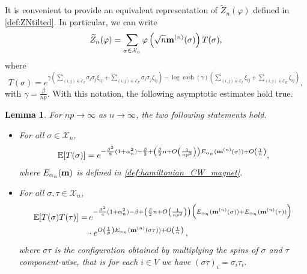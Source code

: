 \documentclass[11pt,oneside]{amsart}
\numberwithin{equation}{section}  %
\theoremstyle{plain}
\newtheorem{lemma}[theorem]{Lemma}
\theoremstyle{remark}
\def \E {{\mathbb E}}
\def \cE {\mathcal{E}}
\def \s {{\sigma}}
\def \bm {{\bf m}}
\begin{document}
It is convenient to provide an equivalent representation of $\widetilde{Z}_n(\varphi)$ defined in \eqref{def:ZNtilted}.
In particular, we can write
\begin{equation}
\label{eq:ZT}
\widetilde{Z}_n(\varphi) = \sum_{\sigma \in \mathcal{X}_n} \varphi\left(\sqrt{n} \bm^{(n)}(\sigma) \right) T(\sigma),
\end{equation}
where
\begin{equation}
\label{def:Tsigma}
T(\sigma) = e^{\gamma \left( \sum_{(i,j) \in \cE_I} \sigma_i \sigma_j \xi_{ij} + \sum_{(i,j) \in \cE_E} \sigma_i \sigma_j \zeta_{ij} \right) - \log \cosh(\gamma) \left(\sum_{(i,j) \in \cE_I} \xi_{ij} + \sum_{(i,j) \in \cE_E} \zeta_{ij}\right)},
\end{equation}
with $\gamma = \frac{\beta}{np}$. With this notation, the following asymptotic estimates hold true.
\begin{lemma}
\label{lemma:T}
For $np \to \infty$ as $n \to \infty$, the two following statements hold.
\begin{itemize}
\item[(i)] For all $\sigma \in \mathcal{X}_n$,
$$ 
\E[T(\sigma)] = 
e^{- \frac{\beta^2}{8} (1+\alpha_n^2)-\frac{\beta}{2} + \left(\frac{\beta}{2}n+O\left(\frac{1}{np^2}\right)\right) E_{\alpha_n}(\bm^{(n)}(\s)) +O \left ( \frac{1}{n}\right )},
$$
where $E_{\alpha_n}(\bm)$ is defined in \eqref{def:hamiltonian_CW_magnet}.
\item[(ii)] For all $\sigma, \tau \in \mathcal{X}_n$,
\[
\begin{split}
\E[T(\sigma)T(\tau)] 
= &\, e^{- \frac{\beta^2}{4} (1+\alpha_n^2) -\beta
 + \left(\frac{\beta}{2}n+O\left(\frac{1}{np^2}\right)\right)
\Big( E_{\alpha_n} (\bm^{(n)}(\sigma)) +E_{\alpha_n}(\bm^{(n)}(\tau)) \Big)}\\
& \cdot e^{ O\left(\frac{1}{p}\right) E_{\alpha_n} (\bm^{(n)}(\sigma\tau))+ O \left ( \frac{1}{n}\right)}\,,
\end{split}
\]
where $\sigma \tau$ is the configuration obtained by multiplying the spins of $\sigma$ and $\tau$ component-wise, that is for each 
$i \in V$ we have $(\sigma \tau)_i=\sigma_i \tau_i$.
\end{itemize}

\end{lemma}
\end{document}

